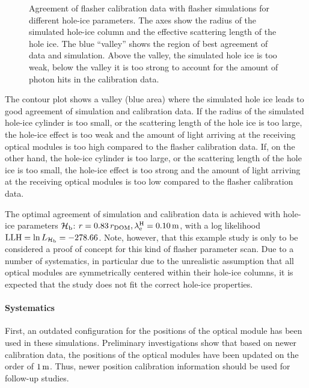 \begin{figure}[htbp]
  \caption{Agreement of flasher calibration data with flasher simulations for different hole-ice parameters. The axes show the radius of the simulated hole-ice column and the effective scattering length of the hole ice. The blue ``valley'' shows the region of best agreement of data and simulation. Above the valley, the simulated hole ice is too weak, below the valley it is too strong to account for the amount of photon hits in the calibration data.}
  \label{fig:ut4nao7X}
\end{figure}

The contour plot shows a valley (blue area) where the simulated hole ice
leads to good agreement of simulation and calibration data. If the
radius of the simulated hole-ice cylinder is too small, or the
scattering length of the hole ice is too large, the hole-ice effect is
too weak and the amount of light arriving at the receiving optical
modules is too high compared to the flasher calibration data. If, on the
other hand, the hole-ice cylinder is too large, or the scattering length
of the hole ice is too small, the hole-ice effect is too strong and the
amount of light arriving at the receiving optical modules is too low
compared to the flasher calibration data.

The optimal agreement of simulation and calibration data is achieved
with hole-ice parameters \({\mathcal{H}_\text{b}}\):
\(r = 0.83\,r_\text{DOM}, \lambda_\text{e}^\text{H} = 0.10\text{\,m}\), with a log likelihood
\(\text{LLH} = \ln L_{\mathcal{H}_\text{b}} = -278.66\). Note, however, that this example
study is only to be considered a proof of concept for this kind of
flasher parameter scan. Due to a number of systematics, in particular
due to the unrealistic assumption that all optical modules are
symmetrically centered within their hole-ice columns, it is expected
that the study does not fit the correct hole-ice properties.

\paragraph{Systematics}

First, an outdated configuration for the positions of the optical module
has been used in these simulations. Preliminary investigations show that
based on newer calibration data, the positions of the optical modules
have been updated on the order of \(1\text{\,m}\). Thus, newer position
calibration information should be used for follow-up studies.

